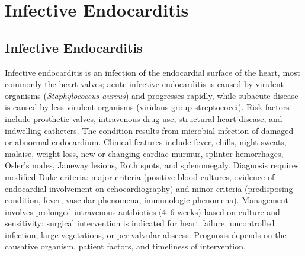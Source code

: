 \section{Infective Endocarditis}








\label{sec:section:Infective Endocarditis}

\subsection{Infective Endocarditis}
\label{sec:Infective Endocarditis}
Infective endocarditis is an infection of the endocardial surface of the heart, most commonly the heart valves; acute infective endocarditis is caused by virulent organisms (\textit{Staphylococcus aureus}) and progresses rapidly, while subacute disease is caused by less virulent organisms (viridans group streptococci). Risk factors include prosthetic valves, intravenous drug use, structural heart disease, and indwelling catheters. The condition results from microbial infection of damaged or abnormal endocardium. Clinical features include fever, chills, night sweats, malaise, weight loss, new or changing cardiac murmur, splinter hemorrhages, Osler's nodes, Janeway lesions, Roth spots, and splenomegaly. Diagnosis requires modified Duke criteria: major criteria (positive blood cultures, evidence of endocardial involvement on echocardiography) and minor criteria (predisposing condition, fever, vascular phenomena, immunologic phenomena). Management involves prolonged intravenous antibiotics (4--6 weeks) based on culture and sensitivity; surgical intervention is indicated for heart failure, uncontrolled infection, large vegetations, or perivalvular abscess. Prognosis depends on the causative organism, patient factors, and timeliness of intervention.


